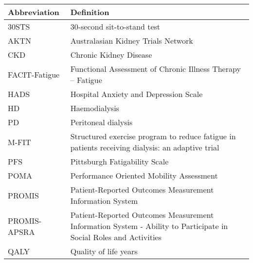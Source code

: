 \documentclass[
]{article}
\begin{document}
\begin{table}[H]
  \renewcommand{\arraystretch}{1.5}
  \centering
  \begin{tabular}{p{}p{}}
    \toprule
    Abbreviation  & Definition                                                                                                       \\
    \midrule
    30STS         & 30-second sit-to-stand test                                                                                      \\
    AKTN          & Australasian Kidney Trials Network                                                                               \\
    CKD           & Chronic Kidney Disease                                                                                           \\
    FACIT-Fatigue & Functional Assessment of Chronic Illness Therapy – Fatigue                                                       \\
    HADS          & Hospital Anxiety and Depression Scale                                                                            \\
    HD            & Haemodialysis                                                                                                    \\
    PD            & Peritoneal dialysis                                                                                              \\
    M-FIT         & Structured exercise program to reduce fatigue in patients receiving dialysis: an adaptive trial                  \\
    PFS           & Pittsburgh Fatigability Scale                                                                                    \\
    POMA          & Performance Oriented Mobility Assessment                                                                         \\
    PROMIS        & Patient-Reported Outcomes Measurement Information System                                                         \\
    PROMIS-APSRA  & Patient-Reported Outcomes Measurement Information System - Ability to Participate in Social Roles and Activities \\
    QALY          & Quality of life years                                                                                            \\

\end{tabular}
\end{table}
\end{document}
